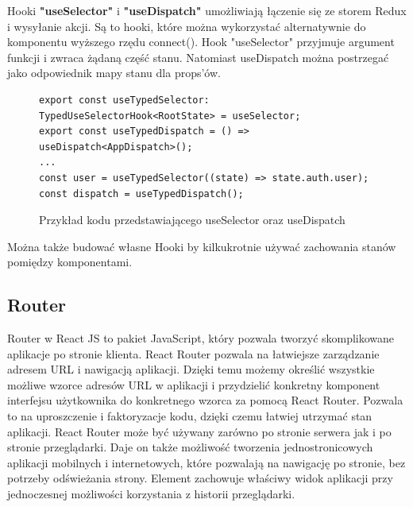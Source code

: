 \documentclass[a4paper,twoside,12pt]{book}
\begin{document}
Hooki \textbf{"useSelector"} i \textbf{"useDispatch"} umożliwiają łączenie się ze storem Redux i wysyłanie akcji. Są to hooki, które można wykorzystać alternatywnie do komponentu wyższego rzędu connect(). Hook "useSelector" przyjmuje argument funkcji i zwraca żądaną część stanu. Natomiast useDispatch można postrzegać jako odpowiednik mapy stanu dla props'ów.   

\begin{figure}[H]
    \begin{lstlisting}
export const useTypedSelector: TypedUseSelectorHook<RootState> = useSelector;
export const useTypedDispatch = () => useDispatch<AppDispatch>();
...
const user = useTypedSelector((state) => state.auth.user);
const dispatch = useTypedDispatch();
    \end{lstlisting}
    \caption{Przykład kodu przedstawiającego useSelector oraz useDispatch}
    \label{fig:pseudokod:listings}
\end{figure}





Można także budować własne Hooki by kilkukrotnie używać zachowania stanów pomiędzy komponentami.



\subsection{Router}
Router w React JS to pakiet JavaScript, który pozwala tworzyć skomplikowane aplikacje po stronie klienta. React Router pozwala na łatwiejsze zarządzanie adresem URL i nawigacją aplikacji. Dzięki temu możemy określić wszystkie możliwe wzorce adresów URL w aplikacji i przydzielić konkretny komponent interfejsu użytkownika do konkretnego wzorca za pomocą React Router. Pozwala to na uproszczenie i faktoryzacje kodu, dzięki czemu łatwiej utrzymać stan aplikacji. React Router może być używany zarówno po stronie serwera jak i po stronie przeglądarki. Daje on także możliwość tworzenia jednostronicowych aplikacji mobilnych i internetowych, które pozwalają na nawigację po stronie, bez potrzeby odświeżania strony. Element zachowuje właściwy widok aplikacji przy jednoczesnej możliwości korzystania z historii przeglądarki.
\end{document}
